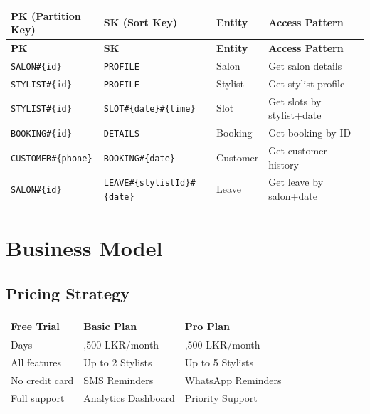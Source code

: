 \documentclass[12pt,a4paper]{report}
\begin{document}
\begin{longtable}{p{3.5cm} p{3.5cm} p{3cm} p{4cm}}
  \toprule
  \textbf{PK (Partition Key)} & \textbf{SK (Sort Key)} & \textbf{Entity} & \textbf{Access Pattern} \\
  \midrule
  \endfirsthead
  \toprule
  \textbf{PK} & \textbf{SK} & \textbf{Entity} & \textbf{Access Pattern} \\
  \midrule
  \endhead
  \bottomrule
  \endfoot

  \texttt{SALON\#\{id\}}        & \texttt{PROFILE}                        & Salon         & Get salon details \\[4pt]
  \texttt{STYLIST\#\{id\}}      & \texttt{PROFILE}                        & Stylist       & Get stylist profile \\[4pt]
  \texttt{STYLIST\#\{id\}}      & \texttt{SLOT\#\{date\}\#\{time\}}       & Slot          & Get slots by stylist+date \\[4pt]
  \texttt{BOOKING\#\{id\}}      & \texttt{DETAILS}                        & Booking       & Get booking by ID \\[4pt]
  \texttt{CUSTOMER\#\{phone\}}  & \texttt{BOOKING\#\{date\}}              & Customer      & Get customer history \\[4pt]
  \texttt{SALON\#\{id\}}        & \texttt{LEAVE\#\{stylistId\}\#\{date\}} & Leave         & Get leave by salon+date \\
\end{longtable}

\chapter{Business Model}

\section{Pricing Strategy}

\begin{center}
\begin{tabular}{>{\centering}p{4cm} >{\centering}p{4cm} >{\centering\arraybackslash}p{4cm}}
  \toprule
  \textbf{Free Trial}     & \textbf{Basic Plan}            & \textbf{Pro Plan}             \\
  \midrule
  14 Days                 & 2,500 LKR/month                & 4,500 LKR/month               \\
  All features            & Up to 2 Stylists               & Up to 5 Stylists              \\
  No credit card          & SMS Reminders                  & WhatsApp Reminders            \\
  Full support            & Analytics Dashboard            & Priority Support              \\
  \bottomrule
\end{tabular}
\end{center}
\end{document}
